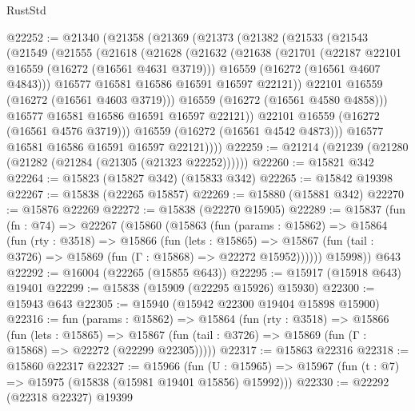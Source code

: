 \begin{lexlean}{RustStd}
\begin{coremodule}
@22252 := @21340
    (@21358
      (@21369
        (@21373
          (@21382
            (@21533
              (@21543
                (@21549
                  (@21555
                    (@21618
                      (@21628
                        (@21632
                          (@21638
                            (@21701
                              (@22187 @22101 @16559 (@16272 (@16561 @4631 @3719)))
                              @16559
                              (@16272 (@16561 @4607 @4843)))
                            @16577
                            @16581
                            @16586
                            @16591
                            @16597
                            @22121))
                        @22101
                        @16559
                        (@16272 (@16561 @4603 @3719)))
                      @16559
                      (@16272 (@16561 @4580 @4858)))
                    @16577
                    @16581
                    @16586
                    @16591
                    @16597
                    @22121))
                @22101
                @16559
                (@16272 (@16561 @4576 @3719)))
              @16559
              (@16272 (@16561 @4542 @4873)))
            @16577
            @16581
            @16586
            @16591
            @16597
            @22121))))
@22259 := @21214 (@21239 (@21280 (@21282 (@21284 (@21305 (@21323 @22252))))))
@22260 := @15821 @342
@22264 := @15823 (@15827 @342) (@15833 @342)
@22265 := @15842 @19398
@22267 := @15838 (@22265 @15857)
@22269 := @15880 (@15881 @342)
@22270 := @15876 @22269
@22272 := @15838 (@22270 @15905)
@22289 := @15837
    (fun (fn : @74) =>
    @22267
      (@15860
        (@15863
          (fun (params : @15862) =>
          @15864
            (fun (rty : @3518) =>
            @15866
              (fun (lets : @15865) =>
              @15867 (fun (tail : @3726) => @15869 (fun (Γ : @15868) => @22272 @15952))))))
        @15998))
    @643
@22292 := @16004 (@22265 (@15855 @643))
@22295 := @15917 (@15918 @643) @19401
@22299 := @15838 (@15909 (@22295 @15926) @15930)
@22300 := @15943 @643
@22305 := @15940 (@15942 @22300 @19404 @15898 @15900)
@22316 := fun (params : @15862) =>
  @15864
    (fun (rty : @3518) =>
    @15866
      (fun (lets : @15865) =>
      @15867 (fun (tail : @3726) => @15869 (fun (Γ : @15868) => @22272 (@22299 @22305)))))
@22317 := @15863 @22316
@22318 := @15860 @22317
@22327 := @15966
    (fun (U : @15965) => @15967 (fun (t : @7) => @15975 (@15838 (@15981 @19401 @15856) @15992)))
@22330 := @22292 (@22318 @22327) @19399

\end{coremodule}
\end{lexlean}
